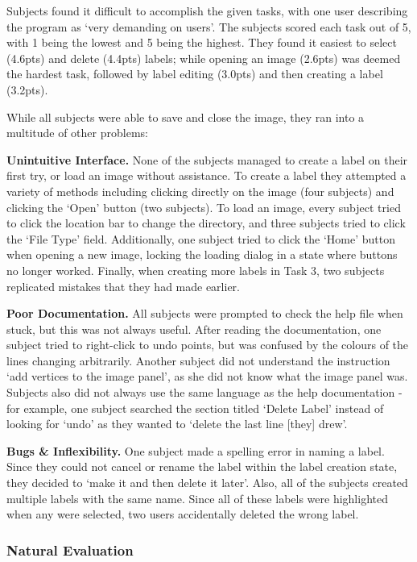 \documentclass[11pt,twocolumn]{article}
\begin{document}
Subjects found it difficult to accomplish the given tasks, with one user describing the program as `very demanding on users'. The subjects scored each task out of 5, with 1 being the lowest and 5 being the highest. They found it easiest to select (4.6pts) and delete (4.4pts) labels; while opening an image (2.6pts) was deemed the hardest task, followed by label editing (3.0pts) and then creating a label (3.2pts).

While all subjects were able to save and close the image, they ran into a multitude of other problems:
 
\textbf{Unintuitive Interface.} None of the subjects managed to create a label on their first try, or load an image without assistance. To create a label they attempted a variety of methods including clicking directly on the image (four subjects) and clicking the `Open' button (two subjects). To load an image, every subject tried to click the location bar to change the directory, and three subjects tried to click the `File Type' field. Additionally, one subject tried to click the `Home' button when opening a new image, locking the loading dialog in a state where buttons no longer worked. Finally, when creating more labels in Task 3, two subjects replicated mistakes that they had made earlier. 

\textbf{Poor Documentation.} All subjects were prompted to check the help file when stuck, but this was not always useful. After reading the documentation, one subject tried to right-click to undo points, but was confused by the colours of the lines changing arbitrarily. Another subject did not understand the instruction `add vertices to the image panel', as she did not know what the
image panel was. Subjects also did not always use the same language as the help documentation - for example, one subject searched the section titled `Delete Label' instead of looking for `undo' as they wanted to `delete the last line [they] drew'.

\textbf{Bugs \& Inflexibility.} One subject made a spelling error in naming a label. Since they could not cancel or rename the label within the label creation state, they decided to `make it and then delete it later'. Also, all of the subjects created multiple labels with the same name. Since all of these labels were highlighted when any were selected, two users accidentally deleted the wrong label.

\subsubsection{Natural Evaluation}
\end{document}
